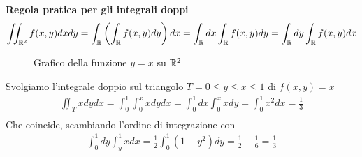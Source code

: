 \begin{defn}
    \textbf{Regola pratica per gli integrali doppi} \\
    \begin{equation}
        \iint_{\mathbb{R}^2} f(x,y) dx dy = \int_{\mathbb{R}} \left( \int_{\mathbb{R}} f(x,y) dy \right) dx = \int_{\mathbb{R}} dx \int_{\mathbb{R}} f(x,y) dy \\
        = \int_{\mathbb{R}} dy \int_{\mathbb{R}} f(x,y) dx
    \end{equation}
\end{defn}

\begin{exmp}
    \begin{figure}[htbp]
        \centering
        \caption{Grafico della funzione $y = x$ su $\mathbb{R}^2$}
        \label{2varplot}
    \end{figure}
    Svolgiamo l'integrale doppio sul triangolo $ T = 0 \leq y \leq x \leq 1$ di $f(x,y) = x$
    \begin{equation*}
        \begin{aligned}
            \iint_T x dydx = \int_0^1 \int_0^x x dydx = \int_0^1 dx \int_0^x x dy = \int_0^1 x^2 dx = \frac{1}{3} \\
        \end{aligned}
    \end{equation*}
    Che coincide, scambiando l'ordine di integrazione con
    \begin{equation*}
        \begin{aligned}
            \int_0^1 dy \int_y^1 x dx = \frac{1}{2} \int_0^1 (1-y^2) dy = \frac{1}{2} - \frac{1}{6} = \frac{1}{3}
        \end{aligned}
    \end{equation*}

\end{exmp}


